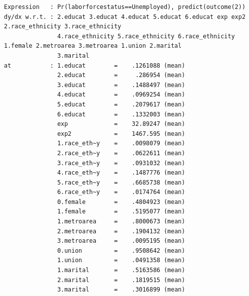 \documentclass[
]{book}
\begin{document}
\begin{verbatim}
Expression   : Pr(laborforcestatus==Unemployed), predict(outcome(2))
dy/dx w.r.t. : 2.educat 3.educat 4.educat 5.educat 6.educat exp exp2 2.race_ethnicity 3.race_ethnicity
               4.race_ethnicity 5.race_ethnicity 6.race_ethnicity 1.female 2.metroarea 3.metroarea 1.union 2.marital
               3.marital
at           : 1.educat        =    .1261088 (mean)
               2.educat        =     .286954 (mean)
               3.educat        =    .1488497 (mean)
               4.educat        =    .0969254 (mean)
               5.educat        =    .2079617 (mean)
               6.educat        =    .1332003 (mean)
               exp             =    32.89247 (mean)
               exp2            =    1467.595 (mean)
               1.race_eth~y    =    .0098079 (mean)
               2.race_eth~y    =    .0622611 (mean)
               3.race_eth~y    =    .0931032 (mean)
               4.race_eth~y    =    .1487776 (mean)
               5.race_eth~y    =    .6685738 (mean)
               6.race_eth~y    =    .0174764 (mean)
               0.female        =    .4804923 (mean)
               1.female        =    .5195077 (mean)
               1.metroarea     =    .8000673 (mean)
               2.metroarea     =    .1904132 (mean)
               3.metroarea     =    .0095195 (mean)
               0.union         =    .9508642 (mean)
               1.union         =    .0491358 (mean)
               1.marital       =    .5163586 (mean)
               2.marital       =    .1819515 (mean)
               3.marital       =    .3016899 (mean)


\end{verbatim}
\end{document}
